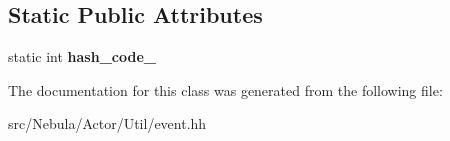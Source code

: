 \subsection*{\-Static \-Public \-Attributes}
\begin{DoxyCompactItemize}
\item 
\hypertarget{classNeb_1_1Event_1_1Actor_1_1Base_ab6711b6cd077caa473f0c3b7416a265f}{static int {\bfseries hash\-\_\-code\-\_\-}}\label{classNeb_1_1Event_1_1Actor_1_1Base_ab6711b6cd077caa473f0c3b7416a265f}

\end{DoxyCompactItemize}


\-The documentation for this class was generated from the following file\-:\begin{DoxyCompactItemize}
\item 
src/\-Nebula/\-Actor/\-Util/event.\-hh\end{DoxyCompactItemize}
